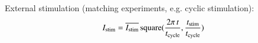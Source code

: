 External stimulation (matching experiments, e.g. cyclic stimulation):
\begin{equation}
I_{\rm stim} = \overline{I_{\rm stim}}\, {\rm square}(\frac{2 \pi\,
  t}{t_{\rm cycle}}, \frac{t_{\rm stim}}{t_{\rm cycle}})
\end{equation}


